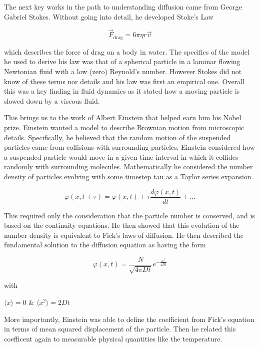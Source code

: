 \documentclass[a4paper,11pt,oneside]{book}
\begin{document}
The next key works in the path to understanding diffusion came from George Gabriel Stokes. Without going into detail, he developed Stoke's Law

\begin{equation}
\vec{F}_{\text{drag}} = 6\pi\eta r \vec{v}
\end{equation}

which describes the force of drag on a body in water. The specifics of the model he used to derive his law was that of a spherical particle in a laminar flowing Newtonian fluid with a low (zero) Reynold's number. However Stokes did not know of these terms nor details and his law was first an empirical one. Overall this was a key finding in fluid dynamics as it stated how a moving particle is slowed down by a viscous fluid.

This brings us to the work of Albert Einstein that helped earn him his Nobel prize. Einstein wanted a model to describe Brownian motion from microscopic details. Specifically, he believed that the random motion of the suspended particles came from collisions with surrounding particles. Einstein considered how a suspended particle would move in a given time interval in which it collides randomly with surrounding molecules. Mathematically he considered the number density of particles evolving with some timestep tau as a Taylor series expansion.

\begin{equation}
\varphi(x, t + \tau) = \varphi(x, t) + \tau \frac{d\varphi(x, t)}{dt} + \ldots
\end{equation}

This required only the consideration that the particle number is conserved, and is based on the continuity equations. He then showed that this evolution of the number density is equivalent to Fick's laws of diffusion. He then described the fundamental solution to the diffusion equation as having the form

\begin{equation}
\varphi(x, t) = \frac{N}{\sqrt{4\pi D t}} e^{-\frac{x^2}{4Dt}}
\end{equation}

with

$\langle x \rangle=0$ \& $\langle x^2 \rangle = 2Dt$

More importantly, Einstein was able to define the coefficient from Fick's equation in terms of mean squared displacement of the particle. Then he related this coefficent again to measurable physical quantities like the temperature.
\end{document}
